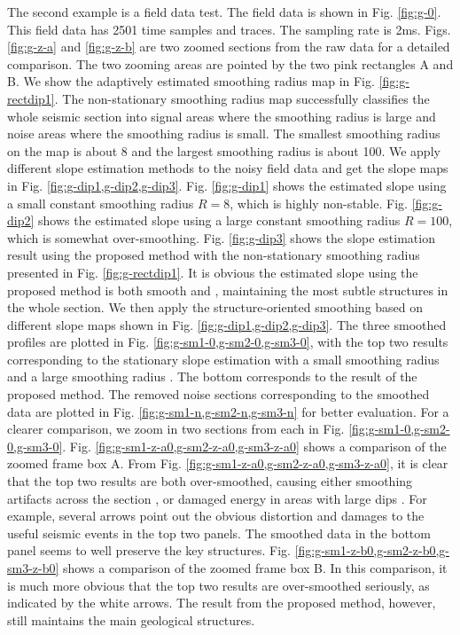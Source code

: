 The second example is a  field data test. The field data is shown in Fig. \ref{fig:g-0}. This field data has 2501 time samples and  traces. The sampling rate is 2ms. Figs. \ref{fig:g-z-a} and \ref{fig:g-z-b} are two zoomed sections from the raw data for a detailed comparison. The two zooming areas are pointed by the two pink rectangles A and B. We show the adaptively estimated smoothing radius map in Fig. \ref{fig:g-rectdip1}. The non-stationary smoothing radius map successfully classifies the whole seismic section into signal areas where the smoothing radius is large and noise areas where the smoothing radius is small. The smallest smoothing radius on the map is about 8 and the largest smoothing radius is about 100. We apply different slope estimation methods to the noisy field data and get the slope maps in Fig. \ref{fig:g-dip1,g-dip2,g-dip3}. Fig. \ref{fig:g-dip1} shows the estimated slope using a small constant smoothing radius $R=8$, which is highly non-stable. Fig. \ref{fig:g-dip2} shows the estimated slope using a large constant smoothing radius $R=100$, which is somewhat over-smoothing. Fig. \ref{fig:g-dip3} shows the slope estimation result using the proposed method with the non-stationary smoothing radius presented in Fig. \ref{fig:g-rectdip1}. It is obvious the estimated slope using the proposed method is both smooth and , maintaining the most subtle structures in the whole section. We then apply the structure-oriented smoothing based on different slope maps shown in Fig. \ref{fig:g-dip1,g-dip2,g-dip3}. The three smoothed profiles are plotted in Fig. \ref{fig:g-sm1-0,g-sm2-0,g-sm3-0}, with the top two results corresponding to the stationary slope estimation with a small smoothing radius  and a large smoothing radius . The bottom  corresponds to the result of the proposed method. The removed noise sections corresponding to the smoothed data are plotted in Fig. \ref{fig:g-sm1-n,g-sm2-n,g-sm3-n} for better evaluation. For a clearer comparison, we zoom in two sections from each  in Fig. \ref{fig:g-sm1-0,g-sm2-0,g-sm3-0}. Fig. \ref{fig:g-sm1-z-a0,g-sm2-z-a0,g-sm3-z-a0} shows a comparison of the zoomed frame box A. From Fig. \ref{fig:g-sm1-z-a0,g-sm2-z-a0,g-sm3-z-a0}, it is clear that the top two results are both over-smoothed, causing either smoothing artifacts across the section , or damaged energy in areas with large dips . For example, several arrows point out the obvious distortion and damages to the useful seismic events in the top two panels. The smoothed data in the bottom panel seems to well preserve the key structures.  Fig. \ref{fig:g-sm1-z-b0,g-sm2-z-b0,g-sm3-z-b0} shows a comparison of the zoomed frame box B.  In this comparison, it is much more obvious that the top two results are over-smoothed seriously, as indicated by the white arrows. The result from the proposed method, however, still maintains the main geological structures. 

